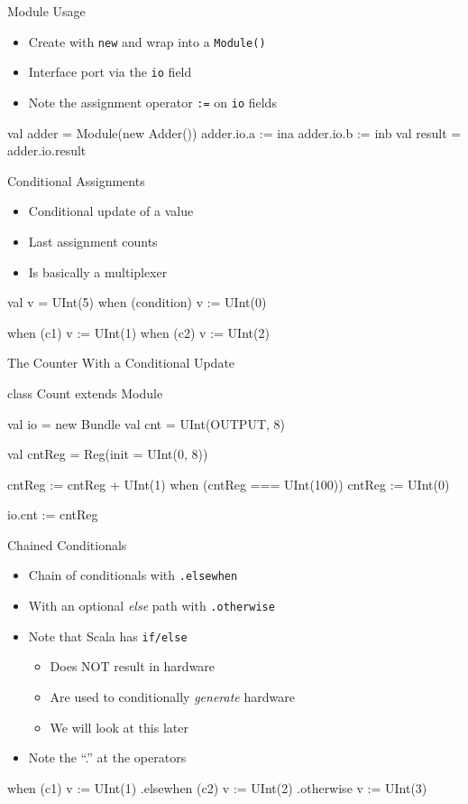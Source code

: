 \documentclass[xcolor=pdflatex,dvipsnames,table]{beamer}
\newcommand{\code}[1]{{\texttt{#1}}}
\begin{document}
\begin{frame}[fragile]{Module Usage}
\begin{itemize}
\item Create with \code{new} and wrap into a \code{Module()}
\item Interface port via the \code{io} field
\item Note the assignment operator \code{:=} on \code{io} fields
\end{itemize}
\begin{chisel}
val adder = Module(new Adder())
adder.io.a := ina
adder.io.b := inb
val result = adder.io.result
\end{chisel}
\end{frame}

\begin{frame}[fragile]{Conditional Assignments}
\begin{itemize}
\item Conditional update of a value
\item Last assignment counts
\item Is basically a multiplexer
\end{itemize}
\begin{chisel}
val v = UInt(5)
when (condition) {
  v := UInt(0)
}

when (c1) { v := UInt(1) }
when (c2) { v := UInt(2) }
\end{chisel}
\end{frame}

\begin{frame}[fragile]{The Counter With a Conditional Update}
\begin{chisel}
class Count extends Module {
  val io = new Bundle {
    val cnt = UInt(OUTPUT, 8)
  }

  val cntReg = Reg(init = UInt(0, 8))

  cntReg := cntReg + UInt(1)
  when (cntReg === UInt(100)) {
    cntReg := UInt(0)
  }

  io.cnt := cntReg
}
\end{chisel}
\end{frame}

\begin{frame}[fragile]{Chained Conditionals}
\begin{itemize}
\item Chain of conditionals with \code{.elsewhen}
\item With an optional \emph{else} path with \code{.otherwise}
\item Note that Scala has \code{if/else}
\begin{itemize}
\item Does NOT result in hardware
\item Are used to conditionally \emph{generate} hardware
\item We will look at this later
\end{itemize}
\item Note the ``.'' at the operators
\end{itemize}
\begin{chisel}
when (c1) { v := UInt(1) }
.elsewhen (c2) { v := UInt(2) }
.otherwise { v := UInt(3) }
\end{chisel}
\end{frame}
\end{document}

